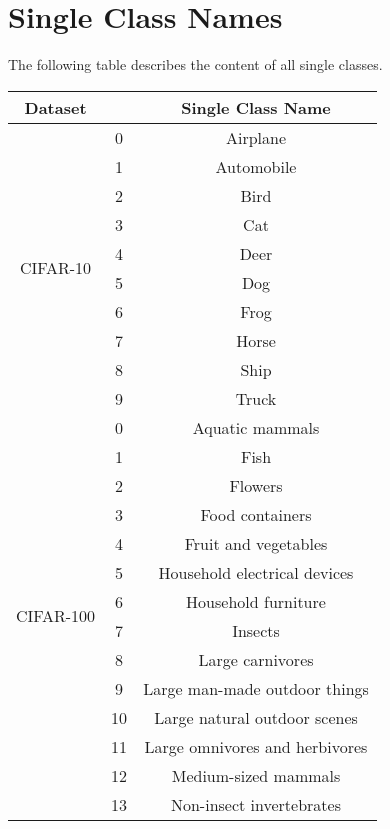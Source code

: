 \documentclass{article}
\newcommand{\head}[1]{\textnormal{\textbf{#1}}}
\begin{document}
\newpage
\section{Single Class Names}
The following table describes the content of all single classes.
\begin{table}[!ht]
\centering
\begin{tabular}{ c c c }
\toprule[1.5pt]
\head{Dataset} & \head{} & \head{Single Class Name}\\
\midrule
\multirow{10}{*}{CIFAR-10}  & 0 & Airplane\\
                            & 1 & Automobile\\
                            & 2 & Bird\\
                            & 3 & Cat\\
                            & 4 & Deer\\
                            & 5 & Dog\\
                            & 6 & Frog\\
                            & 7 & Horse\\
                            & 8 & Ship\\
                            & 9 & Truck\\
\midrule
\multirow{20}{*}{CIFAR-100} & 0 & Aquatic mammals\\
                            & 1 & Fish\\
                            & 2 & Flowers\\
                            & 3 & Food containers\\
                            & 4 & Fruit and vegetables\\
                            & 5 & Household electrical devices\\
                            & 6 & Household furniture\\
                            & 7 & Insects\\
                            & 8 & Large carnivores\\
                            & 9 & Large man-made outdoor things\\
                            & 10 & Large natural outdoor scenes\\
                            & 11 & Large omnivores and herbivores\\
                            & 12 & Medium-sized mammals\\
                            & 13 & Non-insect invertebrates\\

\end{tabular}
\end{table}
\end{document}
